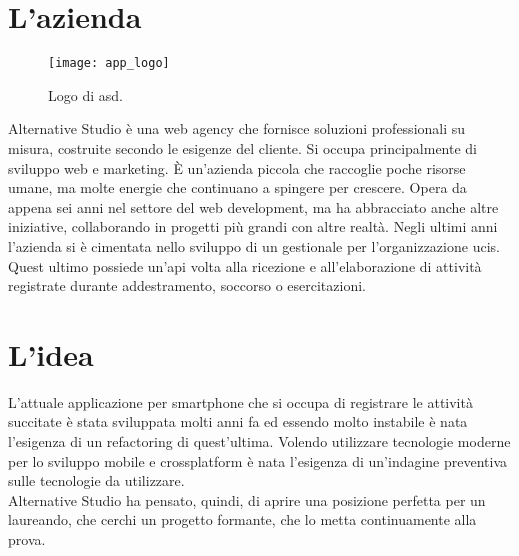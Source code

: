 
\section{L'azienda}

\begin{figure}[htbp]
	\begin{center}
		\texttt{[image: app\_logo]}
	\end{center}
	\caption {Logo di \acrlong{asd}.}
\end{figure}

Alternative Studio è una web agency che fornisce soluzioni professionali su misura, costruite secondo le esigenze del cliente. Si occupa
principalmente di sviluppo web e marketing. È un'azienda piccola che raccoglie poche risorse umane, ma molte energie che continuano a
spingere per crescere. Opera da appena sei anni nel settore del web development, ma ha abbracciato anche altre iniziative, collaborando in
progetti più grandi con altre realtà. Negli ultimi anni l'azienda si è cimentata nello sviluppo di un gestionale per l'organizzazione
\gls{ucis}. Quest ultimo possiede un'\gls{api} volta alla ricezione e all'elaborazione di attività registrate durante addestramento,
soccorso o esercitazioni.

\section{L'idea}

L'attuale applicazione per smartphone che si occupa di registrare le attività succitate è stata sviluppata molti anni fa ed essendo molto
instabile è nata l'esigenza di un refactoring di quest'ultima. Volendo utilizzare tecnologie moderne per lo sviluppo mobile e crossplatform
è nata l'esigenza di un'indagine preventiva sulle tecnologie da utilizzare. \\
Alternative Studio ha pensato, quindi, di aprire una posizione perfetta per un laureando, che cerchi un progetto formante, che lo metta continuamente alla prova.

